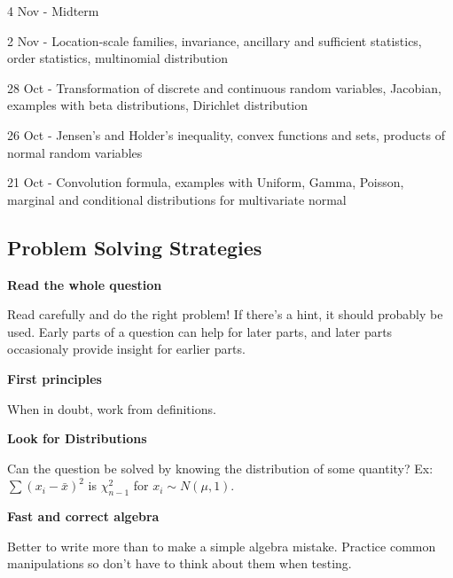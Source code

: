 \documentclass[10pt, twocolumn]{article}
\begin{document}
4 Nov - Midterm

2 Nov - Location-scale families, invariance, ancillary and sufficient
statistics, order statistics, multinomial distribution

28 Oct - Transformation of discrete and continuous random variables,
Jacobian, examples with beta distributions, Dirichlet distribution

26 Oct - Jensen's and Holder's inequality, convex functions and sets,
products of normal random variables

21 Oct - Convolution formula, examples with Uniform, Gamma, Poisson,
marginal and conditional distributions for multivariate normal
\newpage

\subsection*{Problem Solving Strategies}

\textbf{Read the whole question}

Read carefully and do the right problem! If there's a hint, it should
probably be used. Early parts of a question can help for later parts, and later
parts occasionaly provide insight for earlier parts.

\textbf{First principles}

When in doubt, work from definitions.

\textbf{Look for Distributions} 

Can the question be solved by knowing the distribution of some
quantity?  Ex: $\sum (x_i - \bar{x})^2$ is $\chi^2_{n-1}$ for
$x_i \sim N(\mu, 1)$.

\textbf{Fast and correct algebra}

Better to write more than to make a simple algebra mistake.
Practice common manipulations so don't have to think about them
when testing.
\end{document}
